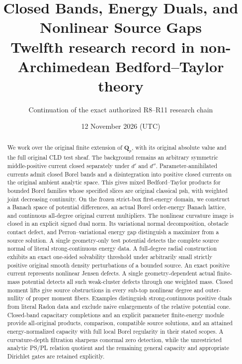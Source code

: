 \documentclass[11pt,a4paper]{article}
\title{Closed Bands, Energy Duals, and Nonlinear Source Gaps\\[5pt]
\large Twelfth research record in non-Archimedean Bedford--Taylor theory}
\author{Continuation of the exact authorized R8--R11 research chain}
\date{12 November 2026 (UTC)}
\numberwithin{equation}{section}
\theoremstyle{definition}
\theoremstyle{remark}
\begin{document}
\maketitle
\begin{abstract}
We work over the original finite extension of $\mathbf Q_p$, with its
original absolute value and the full original CLD test sheaf. The
background remains an arbitrary symmetric middle-positive current
closed separately under $d'$ and $d''$.
Parameter-annihilated currents admit closed Borel bands and a
disintegration into positive closed currents on the original ambient
analytic space. This gives mixed Bedford--Taylor products for bounded
Borel families whose specified slices are original classical psh,
with weighted joint decreasing continuity.
On the frozen strict-box first-energy domain, we construct a Banach
space of potential differences, an actual Borel order-energy Banach
lattice, and continuous all-degree original current multipliers.
The nonlinear curvature image is closed in an explicit signed dual
norm. Its variational normal decomposition, obstacle contact defect,
and Perron--variational energy gap distinguish a maximizer from a
source solution.
A single geometry-only test potential detects the complete source
normal of literal strong-continuous energy data. A full-degree
radial construction exhibits an exact one-sided solvability threshold
under arbitrarily small strictly positive original smooth density
perturbations of a bounded source.
An exact positive current represents nonlinear Jensen defects.
A single geometry-dependent actual finite-mass potential detects
all such weak-cluster defects through one weighted mass.
Closed moment lifts give source obstructions in every sub-top
nonlinear degree and outer-nullity of proper moment fibers.
Examples distinguish strong-continuous positive duals from literal
Radon data and exclude naive enlargements of the relative potential
cone. Closed-band capacitary completions and an explicit parameter
finite-energy module provide all-original products, comparison,
compatible source solutions, and an attained energy-normalized
capacity with full local Borel regularity in their stated scopes.
A curvature-depth filtration sharpens conormal zero detection,
while the unrestricted analytic PS/PL relation quotient and the
remaining general capacity and appropriate Dirichlet gates are
retained explicitly.
\end{abstract}
\newpage
{\small\tableofcontents}
\newpage

\end{document}
